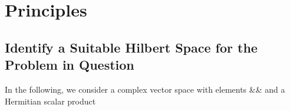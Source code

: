 \section{Principles}

\subsection{Identify a Suitable Hilbert Space for the Problem in Question}

In the following, we consider a complex vector space with elements &\ket{\psi}& and a Hermitian scalar product